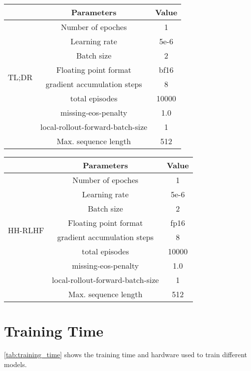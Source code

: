 \begin{table*}[htbp]
    \centering
    \begin{tabular}{ccc}
        \toprule & Parameters& Value\\
        \midrule
        \multirow{8}{*}[-0ex]{TL;DR} 
        & Number of epoches & 1\\
        & Learning rate & 5e-6\\
        & Batch size & 2\\
        & Floating point format & bf16\\
        & gradient accumulation steps & 8\\
        & total episodes & 10000 \\
        & missing-eos-penalty & 1.0 \\
        & local-rollout-forward-batch-size & 1 \\
        & Max. sequence length & 512 \\
        \bottomrule
    \end{tabular}
    \vspace{1em}
    \begin{tabular}{ccc}
        \toprule & Parameters& Value\\
        \midrule
        \multirow{8}{*}[-0ex]{HH-RLHF} 
        & Number of epoches & 1\\
        & Learning rate & 5e-6\\
        & Batch size & 2\\
        & Floating point format & fp16\\
        & gradient accumulation steps & 8\\
        & total episodes & 10000 \\
        & missing-eos-penalty & 1.0 \\
        & local-rollout-forward-batch-size & 1 \\
        & Max. sequence length & 512 \\
        \bottomrule
    \end{tabular}
    \caption{Training Hyperparameters for PPO models}
    \label{PPO training hyperparameters}
\end{table*}


\section{Training Time}
\label{app:training_time}
\vspace{2em}
\cref{tab:training_time} shows the training time and hardware used to train different models.

